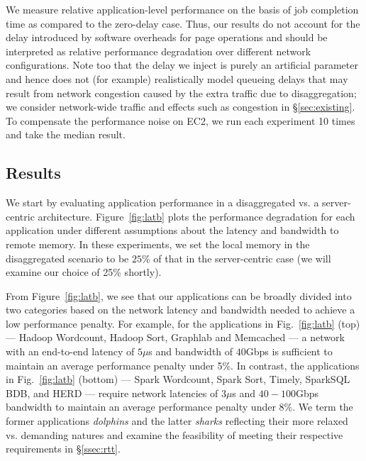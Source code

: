 We measure relative application-level performance on the basis of job completion time as compared to the zero-delay case. Thus, our results do not account for the delay introduced by  software overheads for page operations 
and should be interpreted as relative performance degradation over different network configurations. %
Note too that the delay we inject is purely an artificial parameter and hence does not (for example) realistically model queueing delays that may result from network congestion caused by the extra traffic due to disaggregation; we consider network-wide traffic and effects such as congestion in \S\ref{sec:existing}.
To compensate the performance noise on EC2, we run each experiment 10 times and take the median result.

\vspace{-0.1in}
\subsection{Results}
\label{ssec:rr}
\vspace{-0.05in}
We start by evaluating application performance in a disaggregated vs. a server-centric architecture. 
Figure~\ref{fig:latb} plots the performance degradation for each application under different assumptions about the latency and bandwidth to remote memory. In these experiments, we set the local memory in the disaggregated scenario to be  $25\%$ of that in the server-centric case (we will examine our choice of 25\% shortly). 

From Figure~\ref{fig:latb}, we see that our applications can be broadly divided into two categories based on the network latency and bandwidth needed to achieve a low performance penalty.
For example, for the applications in Fig.~\ref{fig:latb} (top) --- Hadoop Wordcount, Hadoop Sort, Graphlab and Memcached --- a network with an end-to-end latency of $5\mu$s and bandwidth of $40$Gbps is sufficient to maintain an average performance penalty under 5\%. 
In contrast, the applications in Fig.~\ref{fig:latb} (bottom) --- Spark Wordcount, Spark Sort, Timely, SparkSQL BDB, and HERD --- require network latencies of $3\mu$s and $40-100$Gbps bandwidth to maintain an average performance penalty under 8\%. We term the former applications {\em dolphins} and the latter {\em sharks} reflecting their more relaxed vs. demanding natures and examine the feasibility of meeting their respective requirements in \S\ref{ssec:rtt}.

